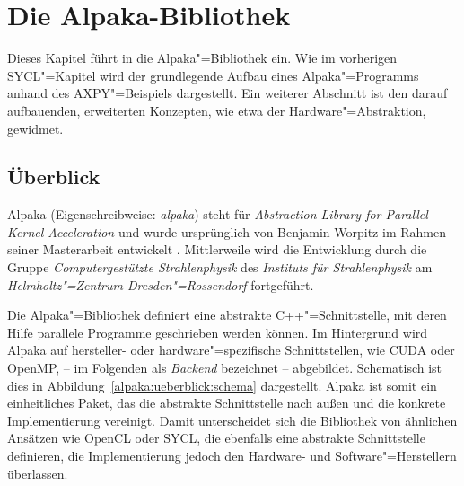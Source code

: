 \chapter{Die Alpaka-Bibliothek}\label{alpaka}

Dieses Kapitel führt in die Alpaka"=Bibliothek ein. Wie im vorherigen
SYCL"=Kapitel wird der grundlegende Aufbau eines Alpaka"=Programms anhand des
AXPY"=Beispiels dargestellt. Ein weiterer Abschnitt ist den darauf aufbauenden,
erweiterten Konzepten, wie etwa der Hardware"=Abstraktion, gewidmet.

\section{Überblick}\label{alpaka:ueberblick}

Alpaka (Eigenschreibweise: \textit{alpaka}) steht für
\textit{Abstraction Library for Parallel Kernel Acceleration} und wurde
ursprünglich von Benjamin Worpitz im Rahmen seiner Masterarbeit entwickelt
\cite[vgl.][]{worpitz2015}. Mittlerweile wird die Entwicklung durch
die Gruppe \textit{Computergestützte Strahlenphysik} des
\textit{Instituts für Strahlenphysik} am
\textit{Helmholtz"=Zentrum Dresden"=Rossendorf} fortgeführt.

Die Alpaka"=Bibliothek definiert eine abstrakte C++"=Schnittstelle, mit deren
Hilfe parallele Programme geschrieben werden können. Im Hintergrund wird Alpaka
auf hersteller- oder hardware"=spezifische Schnittstellen, wie CUDA oder OpenMP,
-- im Folgenden als \textit{Backend} bezeichnet -- abgebildet. Schematisch ist
dies in Abbildung~\ref{alpaka:ueberblick:schema} dargestellt. Alpaka ist somit
ein einheitliches Paket, das die abstrakte Schnittstelle nach außen und die
konkrete Implementierung vereinigt. Damit unterscheidet sich die Bibliothek von
ähnlichen Ansätzen wie OpenCL oder SYCL, die ebenfalls eine abstrakte
Schnittstelle definieren, die Implementierung jedoch den Hardware- und
Software"=Herstellern überlassen.

